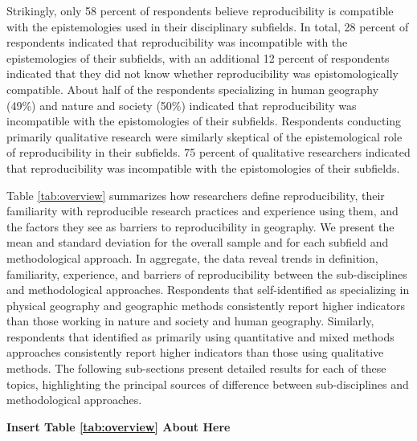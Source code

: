 \documentclass[]{interact}
\theoremstyle{plain}%
\theoremstyle{definition}
\theoremstyle{remark}
\begin{document}
Strikingly, only 58 percent of respondents believe reproducibility is compatible with the epistemologies used in their disciplinary subfields.
In total, 28 percent of respondents indicated that reproducibility was incompatible with the epistemologies of their subfields, with an additional 12 percent of respondents indicated that they did not know whether reproducibility was epistomologically compatible. 
About half of the respondents specializing in human geography (49\%) and nature and society (50\%) indicated that reproducibility was incompatible with the epistomologies of their subfields. 
Respondents conducting primarily qualitative research were similarly skeptical of the epistemological role of reproducibility in their subfields.
75 percent of qualitative researchers indicated that reproducibility was incompatible with the epistomologies of their subfields.

Table \ref{tab:overview} summarizes how researchers define reproducibility, their familiarity with reproducible research practices and experience using them, and the factors they see as barriers to reproducibility in geography. 
We present the mean and standard deviation for the overall sample and for each subfield and methodological approach.
In aggregate, the data reveal trends in definition, familiarity, experience, and barriers of reproducibility between the sub-disciplines and methodological approaches. 
Respondents that self-identified as specializing in physical geography and geographic methods consistently report higher indicators than those working in nature and society and human geography.
Similarly, respondents that identified as primarily using quantitative and mixed methods approaches consistently report higher indicators than those using qualitative methods.
The following sub-sections present detailed results for each of these topics, highlighting the principal sources of difference between sub-disciplines and methodological approaches.

\begin{center}
\textbf{Insert Table \ref{tab:overview} About Here}
\end{center}


\end{document}
